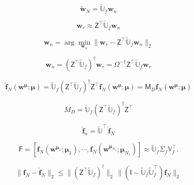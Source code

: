 \documentclass[11pt]{article}
\renewcommand{\vec}[1]{\mathbf{#1}}
\newcommand{\mat}[1]{\mathsf{#1}}
\begin{document}
\begin{equation}
\widetilde{\vec{w}}_N = \widetilde{\mathbb{U}}_f\vec{w}_n
\label{eq:rec_imag}
\end{equation}

\begin{equation}
{\vec{w}}_r \approx \mat{Z}^{\top}\widetilde{\mathbb{U}}_f\vec{w}_n
\end{equation}

\begin{equation}
   \vec{w}_n = \arg\min_{\vec{w}_n} \| \vec{w}_r - \mat{Z}^{\top}\widetilde{\mathbb{U}}_f\vec{w}_n \|_2
   \label{eq:sampling_optimization}
\end{equation}

\begin{equation}
 {\vec{w}_n} = \left(\mat{Z}^{\top}\widetilde{\mathbb{U}}_f\right)^{\dagger}\vec{w}_r = \Omega^{-1}\mat{Z}^{\top}\widetilde{\mathbb{U}}_f\vec{w}_r
\label{eq:solution_ak}
\end{equation}

\begin{equation}
    \widehat{\vec{f}}_N(\vec{w}^{\boldsymbol{\mu}}; \boldsymbol{\mu}) = \widetilde{\mathbb{U}}_f \left(\mat{Z}^\top \widetilde{\mathbb{U}}_f\right)^{\dagger} \mat{Z}^\top \vec{f}_N(\vec{w}^{\boldsymbol{\mu}}; \boldsymbol{\mu}) = \mat{M}_D \vec{f}_N(\vec{w}^{\boldsymbol{\mu}}; \boldsymbol{\mu})
    \label{eq:deim_approx}
\end{equation}

\begin{equation}
 M_D = \widetilde{\mathbb{U}}_f \left(\mat{Z}^\top \widetilde{\mathbb{U}}_f\right)^{\dagger} \mat{Z}^\top
 \label{eq:deim_mat}
\end{equation}

\begin{equation}
    \widehat{\vec{f}}_n  = \widetilde{\mathbb{U}}^\top \, \widehat{\vec{f}}_N
    \label{eq:deim_approx_fn}
\end{equation}

\begin{equation}
\mat{F} = \left[ \vec{f}_N(\vec{w}^{\boldsymbol{\mu}_1}; \boldsymbol{\mu}_1), \cdots, \vec{f}_N(\vec{w}^{\boldsymbol{\mu}_{N_s}}; \boldsymbol{\mu}_{N_s}) \right] \approx \widetilde{\mathbb{U}}_f \mat{\Sigma}_f \mathbb{V}_f^\top.
\end{equation}

\begin{equation}
    \|\vec{f}_N - \widehat{\vec{f}}_N\|_2 \le \|\left(\mat{Z}^\top \widetilde{\mathbb{U}}_f\right)^{\dagger}\|_2 \, \| (\mat{I}-\widetilde{\mathbb{U}}_f\widetilde{\mathbb{U}}_f^{\top})\vec{f}_N\|_2
    \label{eq:deim_error}
\end{equation}
\end{document}
